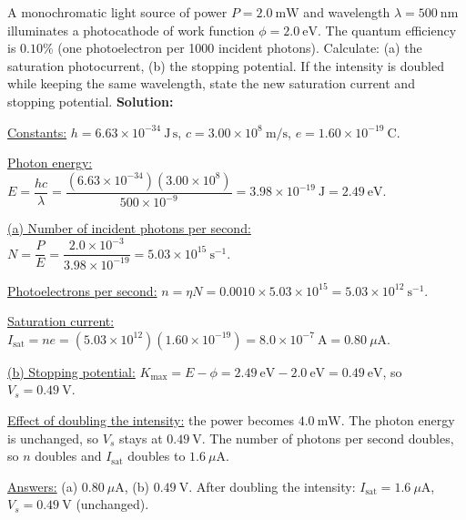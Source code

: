 \documentclass[11pt]{article}
\begin{document}
\begin{exoresolu}
A monochromatic light source of power $P = 2.0\ \mathrm{mW}$ and wavelength $\lambda = 500\ \mathrm{nm}$ illuminates a photocathode of work function $\phi = 2.0\ \mathrm{eV}$. The quantum efficiency is $0.10\%$ (one photoelectron per 1000 incident photons). Calculate: (a) the saturation photocurrent, (b) the stopping potential. If the intensity is doubled while keeping the same wavelength, state the new saturation current and stopping potential.
\tcblower
\textbf{Solution:}\par
\underline{Constants:} $h = 6.63\times10^{-34}\ \mathrm{J\,s}$, $c = 3.00\times10^8\ \mathrm{m/s}$, $e = 1.60\times10^{-19}\ \mathrm{C}$.\par
\underline{Photon energy:} $E = \dfrac{hc}{\lambda} = \dfrac{(6.63\times10^{-34})(3.00\times10^8)}{500\times10^{-9}} = 3.98\times10^{-19}\ \mathrm{J} = 2.49\ \mathrm{eV}$.\par
\underline{(a) Number of incident photons per second:} $N = \dfrac{P}{E} = \dfrac{2.0\times10^{-3}}{3.98\times10^{-19}} = 5.03\times10^{15}\ \mathrm{s^{-1}}$.\par
\underline{Photoelectrons per second:} $n = \eta N = 0.0010 \times 5.03\times10^{15} = 5.03\times10^{12}\ \mathrm{s^{-1}}$.\par
\underline{Saturation current:} $I_{\text{sat}} = n e = (5.03\times10^{12})(1.60\times10^{-19}) = 8.0\times10^{-7}\ \mathrm{A} = 0.80\ \mu\mathrm{A}$.\par
\underline{(b) Stopping potential:} $K_{\max} = E - \phi = 2.49\ \mathrm{eV} - 2.0\ \mathrm{eV} = 0.49\ \mathrm{eV}$, so $V_s = 0.49\ \mathrm{V}$.\par
\underline{Effect of doubling the intensity:} the power becomes $4.0\ \mathrm{mW}$. The photon energy is unchanged, so $V_s$ stays at $0.49\ \mathrm{V}$. The number of photons per second doubles, so $n$ doubles and $I_{\text{sat}}$ doubles to $1.6\ \mu\mathrm{A}$.\par
\underline{Answers:} (a) $0.80\ \mu\mathrm{A}$, (b) $0.49\ \mathrm{V}$. After doubling the intensity: $I_{\text{sat}} = 1.6\ \mu\mathrm{A}$, $V_s = 0.49\ \mathrm{V}$ (unchanged).
\end{exoresolu}
\end{document}
